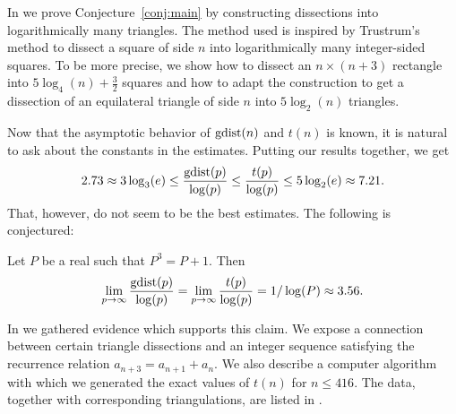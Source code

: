 In  we prove Conjecture~\ref{conj:main} by constructing dissections into logarithmically many triangles. The method used is inspired by Trustrum's method \cite{Trustrum65} to  dissect a square of side $n$ into logarithmically many integer-sided squares. To be more precise, we show how to dissect an $n \times (n+3)$ rectangle into $5 \log_4(n) + \frac{3}{2}$ squares and how to adapt the construction to get a dissection of an equilateral triangle of side $n$ into $5 \log_2(n)$ triangles.


\bigskip

Now that the asymptotic behavior of $\mathop{\mathrm{gdist}}(n)$ and $t(n)$ is known, it is natural to ask about the constants in the estimates. Putting our results together, we get
\begin{eqnarray}
	2.73 \approx 3 \log_3(e) \leq \frac{\mathop{\mathrm{gdist}}(p)}{\log(p)} \leq \frac{t(p)}{\log(p)} \leq 5 \log_2(e) \approx 7.21.
\end{eqnarray}
That, however, do not seem to be the best estimates. The following is conjectured:

\begin{conj-intro}
Let $P$ be a real such that $P^3 = P+1$. Then
\begin{eqnarray}
	\lim_{p \rightarrow \infty} \frac{\mathop{\mathrm{gdist}}(p)}{\log(p)} =
	\lim_{p \rightarrow \infty} \frac{t(p)}{\log(p)} = 1/\log(P) \approx 3.56.
\end{eqnarray}
\end{conj-intro}

In  we gathered evidence which supports this claim. We expose a connection between certain triangle dissections and an integer sequence satisfying the recurrence relation $a_{n+3} = a_{n+1} + a_n$. We also describe a computer algorithm with which we generated the exact values of $t(n)$ for $n \leq 416$. The data, together with corresponding triangulations, are listed in .







